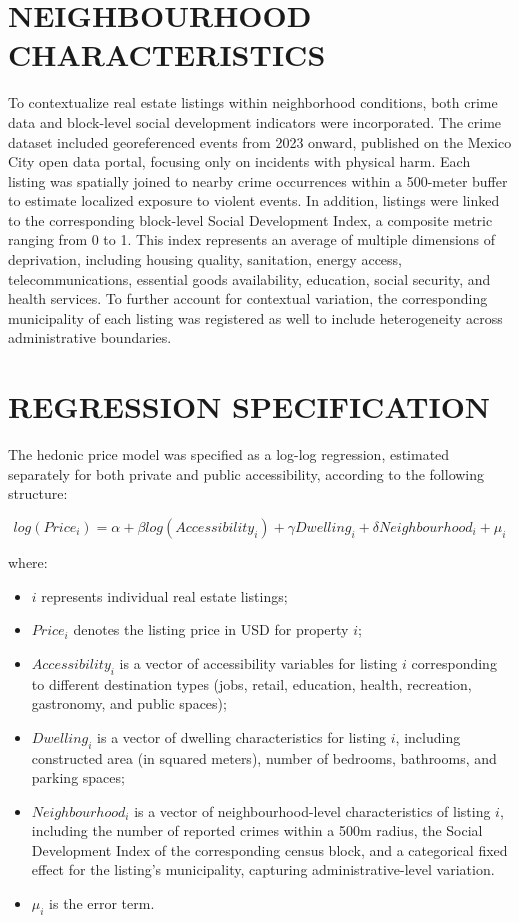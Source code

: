 \documentclass[
  12pt,
]{report}
\providecommand{\tightlist}{%
  \setlength{\itemsep}{0pt}\setlength{\parskip}{0pt}}\usepackage{longtable,booktabs,array}
\begin{document}
\section{NEIGHBOURHOOD
CHARACTERISTICS}\label{neighbourhood-characteristics}

To contextualize real estate listings within neighborhood conditions,
both crime data and block-level social development indicators were
incorporated. The crime dataset included georeferenced events from 2023
onward, published on the Mexico City open data portal, focusing only on
incidents with physical harm. Each listing was spatially joined to
nearby crime occurrences within a 500-meter buffer to estimate localized
exposure to violent events. In addition, listings were linked to the
corresponding block-level Social Development Index, a composite metric
ranging from 0 to 1. This index represents an average of multiple
dimensions of deprivation, including housing quality, sanitation, energy
access, telecommunications, essential goods availability, education,
social security, and health services. To further account for contextual
variation, the corresponding municipality of each listing was registered
as well to include heterogeneity across administrative boundaries.

\section{REGRESSION SPECIFICATION}\label{regression-specification}

The hedonic price model was specified as a log-log regression, estimated
separately for both private and public accessibility, according to the
following structure:

\[
log(Price_i) = \alpha + \beta log(Accessibility_{i}) + \gamma Dwelling_{i} + \delta Neighbourhood_{i} + \mu_i
\]

where:

\begin{itemize}
\tightlist
\item
  \(i\) represents individual real estate listings;
\item
  \(Price_i\) denotes the listing price in USD for property \(i\);
\item
  \(Accessibility_{i}\) is a vector of accessibility variables for
  listing \(i\) corresponding to different destination types (jobs,
  retail, education, health, recreation, gastronomy, and public spaces);
\item
  \(Dwelling_{i}\) is a vector of dwelling characteristics for listing
  \(i\), including constructed area (in squared meters), number of
  bedrooms, bathrooms, and parking spaces;
\item
  \(Neighbourhood_{i}\) is a vector of neighbourhood-level
  characteristics of listing \(i\), including the number of reported
  crimes within a 500m radius, the Social Development Index of the
  corresponding census block, and a categorical fixed effect for the
  listing's municipality, capturing administrative-level variation.
\item
  \(\mu_{i}\) is the error term.
\end{itemize}
\end{document}
